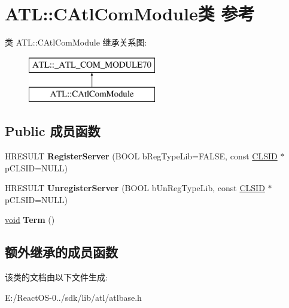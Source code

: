\hypertarget{class_a_t_l_1_1_c_atl_com_module}{}\section{A\+TL\+:\+:C\+Atl\+Com\+Module类 参考}
\label{class_a_t_l_1_1_c_atl_com_module}
类 A\+TL\+:\+:C\+Atl\+Com\+Module 继承关系图\+:\begin{figure}[H]
\begin{center}
\leavevmode
\includegraphics[height=2.000000cm]{class_a_t_l_1_1_c_atl_com_module}
\end{center}
\end{figure}
\subsection*{Public 成员函数}
\begin{DoxyCompactItemize}
\item 
\mbox{\label{class_a_t_l_1_1_c_atl_com_module_a9fc0f90831cfe78fe504c1990d762d56}} 
H\+R\+E\+S\+U\+LT {\bfseries Register\+Server} (B\+O\+OL b\+Reg\+Type\+Lib=F\+A\+L\+SE, const \hyperlink{struct___i_i_d}{C\+L\+S\+ID} $\ast$p\+C\+L\+S\+ID=N\+U\+LL)
\item 
\mbox{\label{class_a_t_l_1_1_c_atl_com_module_a1dd7e101e996a5c7303fe6b032c60d28}} 
H\+R\+E\+S\+U\+LT {\bfseries Unregister\+Server} (B\+O\+OL b\+Un\+Reg\+Type\+Lib, const \hyperlink{struct___i_i_d}{C\+L\+S\+ID} $\ast$p\+C\+L\+S\+ID=N\+U\+LL)
\item 
\mbox{\label{class_a_t_l_1_1_c_atl_com_module_abdd7e49570001315d8f5fd24ab572be3}} 
\hyperlink{interfacevoid}{void} {\bfseries Term} ()
\end{DoxyCompactItemize}
\subsection*{额外继承的成员函数}


该类的文档由以下文件生成\+:\begin{DoxyCompactItemize}
\item 
E\+:/\+React\+O\+S-\/0../sdk/lib/atl/atlbase.\+h\end{DoxyCompactItemize}
